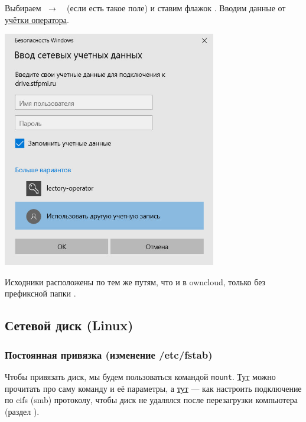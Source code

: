 Выбираем  \ $\rightarrow$ \  (если есть такое поле) и ставим флажок . Вводим данные от \hyperlink{lectory-operator-profile}{учётки оператора}.

\begin{center}
  \begin{minipage}[c]{0.7\textwidth}
    \centering
    \includegraphics[width=0.7\textwidth,fbox]{Images/CloudStorage/windows/login.jpg}
  \end{minipage}
\end{center}

Исходники расположены по тем же путям, что и в owncloud, только без префиксной папки .

\subsection{Сетевой диск (Linux)}

\subsubsection{Постоянная привязка (изменение /etc/fstab)}

Чтобы привязать диск, мы будем пользоваться командой \texttt{mount}. \href{https://losst.pro/montirovanie-diska-v-linux}{Тут} можно прочитать про саму команду и её параметры, а \href{https://ubuntuforums.org/showthread.php?t=288534}{тут} --- как настроить подключение по cifs (smb) протоколу, чтобы диск не удалялся после перезагрузки компьютера (раздел ).

